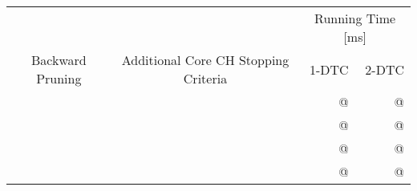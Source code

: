 \begin{tabular}{ccrr}
	\toprule
	                 &                                      & \multicolumn{2}{c}{Running Time [\si{\milli\second}]}         \\
	Backward Pruning & Additional Core CH Stopping Criteria & 1-DTC                                                 & 2-DTC \\
	\midrule
	\xmark           & \xmark                               & @                                                     & @     \\
	\cmark           & \xmark                               & @                                                     & @     \\
	\xmark           & \cmark                               & @                                                     & @     \\
	\cmark           & \cmark                               & @                                                     & @     \\
	\bottomrule
\end{tabular}